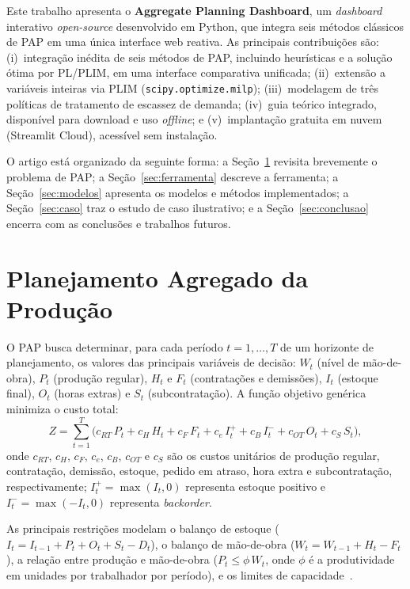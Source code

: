 \documentclass[a4paper,11pt]{article}
\begin{document}
Este trabalho apresenta o \textbf{Aggregate Planning Dashboard}, um \textit{dashboard}
interativo \textit{open-source} desenvolvido em Python, que integra seis métodos
clássicos de PAP em uma única interface web reativa. As principais contribuições são:
(i)~integração inédita de seis métodos de PAP, incluindo heurísticas e a solução ótima
por PL/PLIM, em uma interface comparativa unificada; (ii)~extensão a variáveis inteiras
via PLIM (\texttt{scipy.optimize.milp}); (iii)~modelagem de três políticas de tratamento
de escassez de demanda; (iv)~guia teórico integrado, disponível para download e uso
\textit{offline}; e (v)~implantação gratuita em nuvem (Streamlit Cloud), acessível sem
instalação.

O artigo está organizado da seguinte forma: a Seção~\ref{sec:pap} revisita brevemente o
problema de PAP; a Seção~\ref{sec:ferramenta} descreve a ferramenta; a
Seção~\ref{sec:modelos} apresenta os modelos e métodos implementados; a
Seção~\ref{sec:caso} traz o estudo de caso ilustrativo; e a Seção~\ref{sec:conclusao}
encerra com as conclusões e trabalhos futuros.


\section{Planejamento Agregado da Produção}
\label{sec:pap}

O PAP busca determinar, para cada período $t = 1,\ldots,T$ de um horizonte de
planejamento, os valores das principais variáveis de decisão:
$W_t$ (nível de mão-de-obra), $P_t$ (produção regular), $H_t$ e $F_t$ (contratações e
demissões), $I_t$ (estoque final), $O_t$ (horas extras) e $S_t$ (subcontratação).
A função objetivo genérica minimiza o custo total:
%
\begin{equation}
  \label{eq:custo}
  Z = \sum_{t=1}^{T}\bigl(
    c_{RT}\,P_t + c_H\,H_t + c_F\,F_t + c_e\,I_t^{+} + c_B\,I_t^{-}
    + c_{OT}\,O_t + c_S\,S_t
  \bigr),
\end{equation}
%
onde $c_{RT}$, $c_H$, $c_F$, $c_e$, $c_B$, $c_{OT}$ e $c_S$ são os custos unitários
de produção regular, contratação, demissão, estoque, pedido em atraso, hora extra e
subcontratação, respectivamente; $I_t^{+} = \max(I_t,0)$ representa estoque positivo e
$I_t^{-} = \max(-I_t,0)$ representa \textit{backorder}.

As principais restrições modelam o balanço de estoque
($I_t = I_{t-1} + P_t + O_t + S_t - D_t$),
o balanço de mão-de-obra ($W_t = W_{t-1} + H_t - F_t$),
a relação entre produção e mão-de-obra ($P_t \leq \phi\,W_t$, onde $\phi$ é a
produtividade em unidades por trabalhador por período),
e os limites de capacidade~\citep{hanssmann1960,silver1967}.
\end{document}
